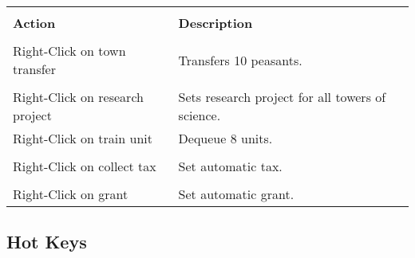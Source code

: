 \begin{tabular}{|p{2in} p{2in}|}
    \hline \\
    \textbf{Action} & \textbf{Description} \\ \\
    \hline    
    Right-Click on town transfer & Transfers 10 peasants. \\ \\
    Right-Click on research project & Sets research project for all towers of science. \\
    Right-Click on train unit & Dequeue 8 units. \\ \\
    Right-Click on collect tax & Set automatic tax. \\ \\
    Right-Click on grant & Set automatic grant. \\
    \hline
\end{tabular}

\subsection{\textsf{Hot Keys}}


